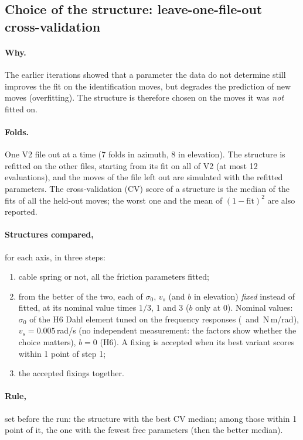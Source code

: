 \documentclass[10pt,a4paper]{article}
\numberwithin{equation}{section}
\begin{document}
\subsection{Choice of the structure: leave-one-file-out cross-validation}
\paragraph{Why.} The earlier iterations showed that a parameter the data do not determine still improves the fit on the identification moves, but degrades the prediction of new moves (overfitting). The structure is therefore chosen on the moves it was \emph{not} fitted on.
\paragraph{Folds.} One V2 file out at a time (7 folds in azimuth, 8 in elevation). The structure is refitted on the other files, starting from its fit on all of V2 (at most 12 evaluations), and the moves of the file left out are simulated with the refitted parameters. The cross-validation (CV) score of a structure is the median of the fits of all the held-out moves; the worst one and the mean of $(1-\mathrm{fit})^2$ are also reported.
\paragraph{Structures compared,} for each axis, in three steps:
\begin{enumerate}
\item cable spring or not, all the friction parameters fitted;
\item from the better of the two, each of $\sigma_0$, $v_s$ (and $b$ in elevation) \emph{fixed} instead of fitted, at its nominal value times $1/3$, 1 and 3 ($b$ only at 0). Nominal values: $\sigma_0$ of the H6 Dahl element tuned on the frequency responses (\nominalSigmaAz\ and \nominalSigmaEl\,N\,m/rad), $v_s=0.005$\,rad/s (no independent measurement: the factors show whether the choice matters), $b=0$ (H6). A fixing is accepted when its best variant scores within 1 point of step 1;
\item the accepted fixings together.
\end{enumerate}
\paragraph{Rule,} set before the run: the structure with the best CV median; among those within 1 point of it, the one with the fewest free parameters (then the better median).
\end{document}
